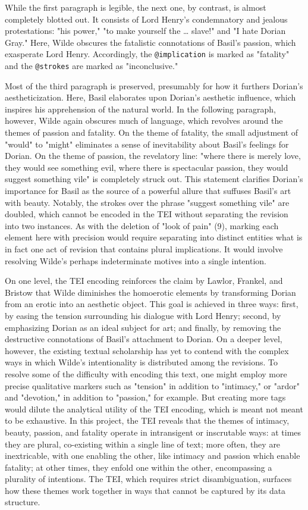 \documentclass[11pt]{article}
\begin{document}
While the first paragraph is legible, the next one, by contrast, is
almost completely blotted out. It consists of Lord Henry's
condemnatory and jealous protestations: "his power," "to make yourself
the \ldots{}  slave!" and "I hate Dorian Gray." Here, Wilde obscures the
fatalistic connotations of Basil's passion, which exasperate Lord
Henry.  Accordingly, the \texttt{@implication} is marked as "fatality" and
the \texttt{@strokes} are marked as "inconclusive."

Most of the third paragraph is preserved, presumably for how it
furthers Dorian's aestheticization. Here, Basil elaborates upon
Dorian's aesthetic influence, which inspires his apprehension of the
natural world. In the following paragraph, however, Wilde again
obscures much of language, which revolves around the themes of passion
and fatality. On the theme of fatality, the small adjustment of
"would" to "might" eliminates a sense of inevitability about Basil's
feelings for Dorian.  On the theme of passion, the revelatory line:
"where there is merely love, they would see something evil, where
there is spectacular passion, they would suggest something vile" is
completely struck out. This statement clarifies Dorian's importance
for Basil as the source of a powerful allure that suffuses Basil's art
with beauty. Notably, the strokes over the phrase "suggest something
vile" are doubled, which cannot be encoded in the TEI without
separating the revision into two instances. As with the deletion of
"look of pain" (9), marking each element here with precision would
require separating into distinct entities what is in fact one act of
revision that contains plural implications. It would involve resolving
Wilde's perhaps indeterminate motives into a single intention.

On one level, the TEI encoding reinforces the claim by Lawlor,
Frankel, and Bristow that Wilde diminishes the homoerotic elements by
transforming Dorian from an erotic into an aesthetic object. This goal
is achieved in three ways: first, by easing the tension surrounding
his dialogue with Lord Henry; second, by emphasizing Dorian as an
ideal subject for art; and finally, by removing the destructive
connotations of Basil's attachment to Dorian. On a deeper level,
however, the existing textual scholarship has yet to contend with the
complex ways in which Wilde's intentionality is distributed among the
revisions. To resolve some of the difficulty with encoding this text,
one might employ more precise qualitative markers such as "tension" in
addition to "intimacy," or "ardor" and "devotion," in addition to
"passion," for example. But creating more tags would dilute the
analytical utility of the TEI encoding, which is meant not meant to be
exhaustive. In this project, the TEI reveals that the themes of
intimacy, beauty, passion, and fatality operate in intransigent or
inscrutable ways: at times they are plural, co-existing within a
single line of text; more often, they are inextricable, with one
enabling the other, like intimacy and passion which enable fatality;
at other times, they enfold one within the other, encompassing a
plurality of intentions. The TEI, which requires strict
disambiguation, surfaces how these themes work together in ways that
cannot be captured by its data structure.
\end{document}
